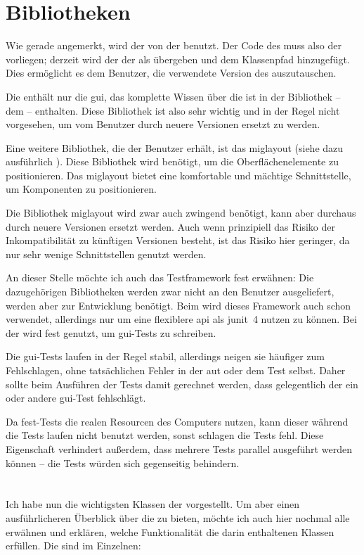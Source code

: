 \section{Bibliotheken}
Wie gerade angemerkt, wird der \md von der \mdg benutzt. Der Code des \md muss also der \mdg vorliegen; derzeit wird der \md der \mdg als  übergeben und dem Klassenpfad hinzugefügt. Dies ermöglicht es dem Benutzer, die verwendete Version des \md auszutauschen.

Die \mdg enthält nur die \gls{gui}, das komplette Wissen über die \mic ist in der Bibliothek -- dem \md -- enthalten. Diese Bibliothek ist also sehr wichtig und in der Regel nicht vorgesehen, um vom Benutzer durch neuere Versionen ersetzt zu werden.

Eine weitere Bibliothek, die der Benutzer erhält, ist das miglayout (siehe dazu ausführlich \cite{Mig2011}). Diese Bibliothek wird benötigt, um die Oberflächenelemente zu positionieren. Das miglayout bietet eine komfortable und mächtige Schnittstelle, um Komponenten zu positionieren.

Die Bibliothek miglayout wird zwar auch zwingend benötigt, kann aber durchaus durch neuere Versionen ersetzt werden. Auch wenn prinzipiell das Risiko der Inkompatibilität zu künftigen Versionen besteht, ist das Risiko hier geringer, da nur sehr wenige Schnittstellen genutzt werden.

An dieser Stelle möchte ich auch das Testframework \gls{fest} erwähnen: Die dazugehörigen Bibliotheken werden zwar nicht an den Benutzer ausgeliefert, werden aber zur Entwicklung benötigt. Beim \md wird dieses Framework auch schon verwendet, allerdings nur um eine flexiblere \gls{api} als \gls{junit}~4 nutzen zu können. Bei der \mdg wird \gls{fest} genutzt, um \gls{gui}-Tests zu schreiben.

Die \gls{gui}-Tests laufen in der Regel stabil, allerdings neigen sie häufiger zum Fehlschlagen, ohne tatsächlichen Fehler in der \gls{aut} oder dem Test selbst. Daher sollte beim Ausführen der Tests damit gerechnet werden, dass gelegentlich der ein oder andere \gls{gui}-Test fehlschlägt.

Da \gls{fest}-Tests die realen Resourcen des Computers nutzen, kann dieser während die Tests laufen nicht benutzt werden, sonst schlagen die Tests fehl. Diese Eigenschaft verhindert außerdem, dass mehrere Tests parallel ausgeführt werden können -- die Tests würden sich gegenseitig behindern. \cite[Abschnitt~3.2]{Roesch2011fest}

\section{\packages}
Ich habe nun die wichtigsten Klassen der \mdg vorgestellt. Um aber einen ausführlicheren Überblick über die \mdg zu bieten, möchte ich auch hier nochmal alle \packages erwähnen und erklären, welche Funktionalität die darin enthaltenen Klassen erfüllen. Die \packages sind im Einzelnen:

